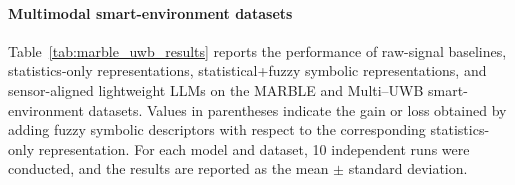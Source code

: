 \documentclass[preprint,12pt]{elsarticle}
\begin{document}
\paragraph{Multimodal smart-environment datasets}

Table~\ref{tab:marble_uwb_results} reports the performance of raw-signal baselines, statistics-only representations, statistical+fuzzy symbolic representations, and sensor-aligned lightweight LLMs on the MARBLE and Multi--UWB smart-environment datasets. Values in parentheses indicate the gain or loss obtained by adding fuzzy symbolic descriptors with respect to the corresponding statistics-only representation. For each model and dataset, 10 independent runs were conducted, and the results are reported as the mean $\pm$ standard deviation. 
\end{document}
